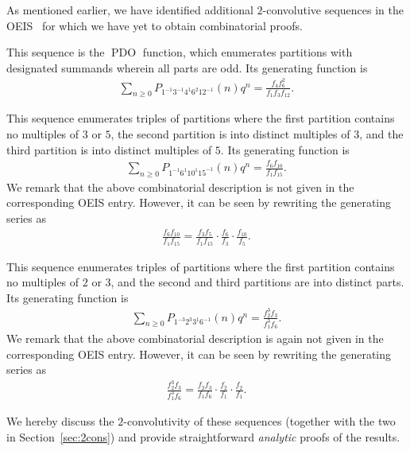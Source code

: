 \documentclass[12pt,reqno]{amsart}
\numberwithin{equation}{section}
\theoremstyle{plain}
\theoremstyle{definition}
\theoremstyle{named}
\newcommand{\PDO}{\operatorname{PDO}}
\begin{document}
As mentioned earlier, we have identified additional $2$-convolutive sequences in the OEIS~\cite{OEIS} for which we have yet to obtain combinatorial proofs.
\begin{description}[itemsep=2pt]
	\item[A102186] This sequence is the $\PDO$ function, which enumerates partitions with designated summands wherein all parts are odd. Its generating function is
	\begin{align*}
		\sum_{n\ge 0} P_{1^{-1}3^{-1}4^{1}6^{2}12^{-1}}(n) q^n = \frac{f_4 f_6^2}{f_1 f_3 f_{12}}.
	\end{align*}
	
	\item[A094023] This sequence enumerates triples of partitions where the first partition contains no multiples of $3$ or $5$, the second partition is into distinct multiples of $3$, and the third partition is into distinct multiples of $5$. Its generating function is
	\begin{align*}
		\sum_{n\ge 0} P_{1^{-1} 6^1 10^{1} 15^{-1}}(n) q^n = \frac{f_6 f_{10}}{f_1 f_{15}}.
	\end{align*}
    We remark that the above combinatorial description is not given in the corresponding OEIS entry. However, it can be seen by rewriting the generating series as
	\begin{align*}
		\frac{f_6 f_{10}}{f_1 f_{15}} = \frac{f_3 f_5}{f_1 f_{15}} \cdot \frac{f_6}{f_3} \cdot \frac{f_{10}}{f_5}.
	\end{align*}

    \item[A128128] This sequence enumerates triples of partitions where the first partition contains no multiples of $2$ or $3$, and the second and third partitions are into distinct parts. Its generating function is
	\begin{align*}
		\sum_{n\ge 0} P_{1^{-3} 2^3 3^{1} 6^{-1}}(n) q^n = \frac{f_2^3 f_{3}}{f_1^3 f_{6}}.
	\end{align*}
    We remark that the above combinatorial description is again not given in the corresponding OEIS entry. However, it can be seen by rewriting the generating series as
	\begin{align*}
		\frac{f_2^3 f_{3}}{f_1^3 f_{6}} = \frac{f_2 f_3}{f_1f_6}  \cdot \frac{f_2}{f_1} \cdot \frac{f_2}{f_1}.
	\end{align*}   
\end{description}

We hereby discuss the $2$-convolutivity of these sequences (together with the two in Section~\ref{sec:2cons}) and provide straightforward \emph{analytic} proofs of the results.
\end{document}
